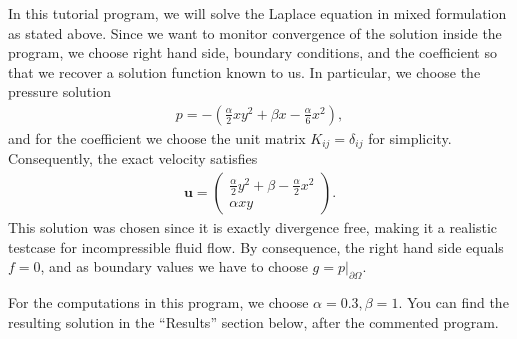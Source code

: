 \documentclass{article}
\renewcommand{\vec}[1]{\mathbf{#1}}
\begin{document}
In this tutorial program, we will solve the Laplace equation in mixed
formulation as stated above. Since we want to monitor convergence of the
solution inside the program, we choose right hand side, boundary conditions,
and the coefficient so that we recover a solution function known to us. In
particular, we choose the pressure solution
\begin{align*}
  p = -\left(\frac \alpha 2 xy^2 + \beta x - \frac \alpha 6 x^2\right),
\end{align*}
and for the coefficient we choose the unit matrix $K_{ij}=\delta_{ij}$ for
simplicity. Consequently, the exact velocity satisfies
\begin{align*}
  \vec u = 
  \begin{pmatrix}
    \frac \alpha 2 y^2 + \beta - \frac \alpha 2 x^2 \\
    \alpha xy
  \end{pmatrix}.
\end{align*}
This solution was chosen since it is exactly divergence free, making it a
realistic testcase for incompressible fluid flow. By consequence, the right
hand side equals $f=0$, and as boundary values we have to choose
$g=p|_{\partial\Omega}$.

For the computations in this program, we choose $\alpha=0.3,\beta=1$. You can
find the resulting solution in the ``Results'' section below, after the
commented program.
\end{document}
